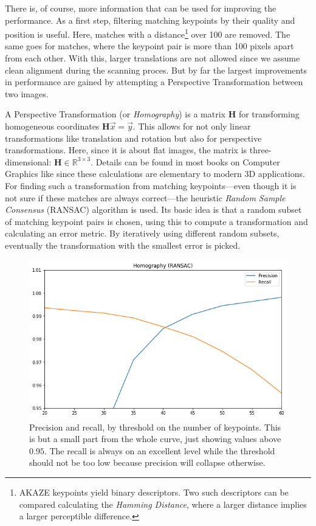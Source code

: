 \documentclass{ltjarticle}
\begin{document}
There is, of course, more information that can be used for improving the performance. As a first step, filtering matching keypoints by their quality and position is useful. Here, matches with a distance\footnote{AKAZE keypoints yield binary descriptors. Two such descriptors can be compared calculating the \emph{Hamming Distance}, where a larger distance implies a larger perceptible difference.} over 100 are removed. The same goes for matches, where the keypoint pair is more than 100 pixels apart from each other. With this, larger translations are not allowed since we assume clean alignment during the scanning proces. But by far the largest improvements in performance are gained by attempting a Perspective Transformation between two images.

A Perspective Transformation (or \emph{Homography}) is a matrix $\mathbf{H}$ for transforming homogeneous coordinates $\mathbf{H}\vec{x} = \vec{y}$. This allows for not only linear transformations like translation and rotation but also for perspective transformations. Here, since it is about flat images, the matrix is three-dimensional: $\mathbf{H} \in \mathbb{R}^{3 \times 3}$. Details can be found in most books on Computer Graphics like \cite{marschner2015fundamentals} since these calculations are elementary to modern 3D applications. For finding such a transformation from matching keypoints---even though it is not sure if these matches are always correct---the heuristic \emph{Random Sample Consensus} (RANSAC) algorithm is used.\cite{fischler1981random} Its basic idea is that a random subset of matching keypoint pairs is chosen, using this to compute a transformation and calculating an error metric. By iteratively using different random subsets, eventually the transformation with the smallest error is picked. 

\begin{figure}
    \centering
    \includegraphics[width=\linewidth]{ransac-performance.png}
    \caption{Precision and recall, by threshold on the number of keypoints. This is but a small part from the whole curve, just showing values above $0.95$. The recall is always on an excellent level while the threshold should not be too low because precision will collapse otherwise.}
    \label{fig:ransac}
\end{figure}
\end{document}
